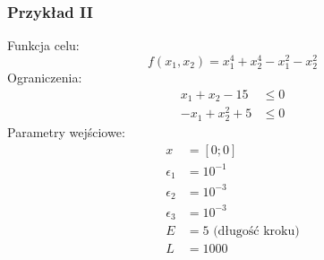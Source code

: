 \documentclass[a4paper,12pt]{article}
\begin{document}
\subsubsection{Przykład II}
Funkcja celu:
\begin{equation}
    f(x_{1}, x_{2}) = x_{1}^{4} + x_{2}^{4} - x_{1}^{2} - x_{2}^{2}
\end{equation}
Ograniczenia:
\begin{equation}
    \begin{split}
        x_{1} + x_{2} - 15 &\leq 0 \\
        -x_{1} + x_{2}^{2} + 5 &\leq 0
    \end{split}
\end{equation}
Parametry wejściowe:
\begin{align*}
    x &= [0; 0] \\
    \epsilon_{1} &= 10^{-1} \\
    \epsilon_{2} &= 10^{-3} \\
    \epsilon_{3} &= 10^{-3} \\
    E &= 5 \mbox{ (długość kroku)}\\
    L &= 1000
\end{align*}
\end{document}
